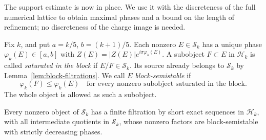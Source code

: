 The support estimate is now in place. We use it with the discreteness of the
full numerical lattice to obtain maximal phases and a bound on the length of
refinement; no discreteness of the charge image is needed.

Fix $k$, and put $a=k/5$, $b=(k+1)/5$.
Each nonzero $E\in\mathcal S_k$ has a unique phase
$\varphi_k(E)\in[a,b]$ with $Z(E)=|Z(E)|e^{i\pi\varphi_k(E)}$.
A subobject $F\subset E$ in $\mathcal H_k$ is called \emph{saturated in
the block} if $E/F\in\mathcal S_k$.  Its source already belongs to
$\mathcal S_k$ by Lemma~\ref{lem:block-filtrations}.  We call $E$
\emph{block-semistable} if
\[
 \varphi_k(F)\le\varphi_k(E)
 \quad\text{for every nonzero subobject saturated in the block.}
\]
The whole object is allowed as such a subobject.

\begin{lemma}\label{lem:block-hn}
Every nonzero object of $\mathcal S_k$ has a finite filtration by short
exact sequences in $\mathcal H_k$, with all intermediate quotients in
$\mathcal S_k$, whose nonzero factors are block-semistable with strictly
decreasing phases.
\end{lemma}

